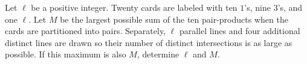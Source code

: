 Let $\ell$ be a positive integer. Twenty cards are labeled with ten $1$'s, nine $3$'s, and one $\ell$. Let $M$ be the largest possible sum of the ten pair-products when the cards are partitioned into pairs. Separately, $\ell$ parallel lines and four additional distinct lines are drawn so their number of distinct intersections is as large as possible. If this maximum is also $M$, determine $\ell$ and $M$.
